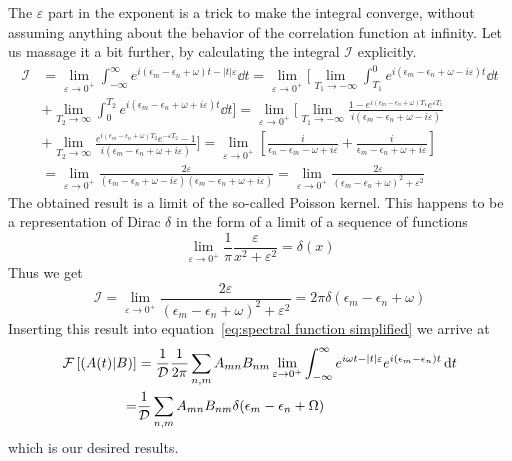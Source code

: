 The \(\varepsilon \) part in the exponent is a trick to make the integral converge, without assuming anything
about the behavior of the correlation function at infinity.
Let us massage it a bit further, by calculating the integral \(\mathcal{I}\) explicitly.
\begin{align}
    \mathcal{I} & = \lim _{\varepsilon \to 0^+} \int_{-\infty}^{\infty}
    e^{ i (\epsilon_m-\epsilon_n+\omega)t -|t| \varepsilon}\dd{t}  = \lim _{\varepsilon \to 0^+}
    \Bigg[\lim_{T_1\to -\infty}\int_{T_1}^{0}  e^{ i (\epsilon_m-\epsilon_n+\omega -i \varepsilon)t}\dd{t} \nonumber                 \\
                & +\lim_{T_2\to \infty}\int_{0}^{T_2}  e^{ i (\epsilon_m-\epsilon_n+\omega + i\varepsilon)t}\dd{t} \Bigg]
    = \lim _{\varepsilon \to 0^+} \Bigg[\lim_{T_1\to -\infty}
    \frac{1-e^{ i (\epsilon_m-\epsilon_n+\omega )T_1} e^{\varepsilon T_1}}{i (\epsilon_m-\epsilon_n+\omega -i \varepsilon)}\nonumber \\
                & + \lim_{T_2\to \infty} \frac{e^{ i (\epsilon_m-\epsilon_n+\omega )T_2} e^{-\varepsilon T_2}-1}
    {i (\epsilon_m-\epsilon_n+\omega +i \varepsilon)}\Bigg]
    = \lim _{\varepsilon \to 0^+} \left[\frac{i}{\epsilon_n-\epsilon_m-\omega +i \varepsilon} +
    \frac{i}{\epsilon_m-\epsilon_n+\omega +i \varepsilon} \right]\nonumber                                                           \\
                & = \lim _{\varepsilon \to 0^+}
    \frac{2\varepsilon}{(\epsilon_m-\epsilon_n+\omega -i \varepsilon)(\epsilon_m-\epsilon_n+\omega +i \varepsilon)}
    =\lim _{\varepsilon \to 0^+} \frac{2\varepsilon}{(\epsilon_m-\epsilon_n+\omega)^2 +\varepsilon^2}
\end{align}
The obtained result is a limit of the so-called Poisson kernel. This happens to be
a representation of Dirac \(\delta\) in the form of a limit of a sequence of functions~\autocite{Byron1992}
\begin{equation}
    \lim _{\varepsilon \to 0^+} \frac{1}{\pi} \frac{\varepsilon}{x^2 +\varepsilon^2} = \delta(x)
\end{equation}
Thus we get
\begin{equation}
    \mathcal{I} = \lim _{\varepsilon \to 0^+} \frac{2\varepsilon}{(\epsilon_m-\epsilon_n+\omega)^2 +\varepsilon^2}
    = 2\pi \delta(\epsilon_m-\epsilon_n+\omega)
\end{equation}
Inserting this result into equation~\eqref{eq:spectral function simplified} we arrive at
\begin{align}
    \mathcal{F}\left[\left(A(t) \middle| B\right)\right] & = \frac{1}{\mathcal{D}} \frac{1}{2 \pi}\sum_{n,m} A_{mn} B_{nm}
    \lim _{\varepsilon \to 0^+} \int_{-\infty}^{\infty} e^{i \omega t-|t|
    \varepsilon}e^{i (\epsilon_m-\epsilon_n) t} \dd{t} \nonumber                                                             \\
    =                                    & \frac{1}{\mathcal{D}}\sum_{n,m} A_{mn} B_{nm} \delta(\epsilon_m-\epsilon_n+\Omega)
\end{align}
which is our desired results.

